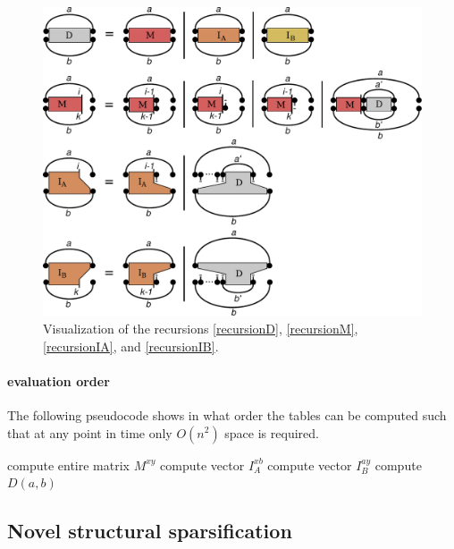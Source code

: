 \documentclass{article}
\newcommand{\DTmat}[2]{D(#1,#2)}
\begin{document}
\begin{figure}
  \centering
  \includegraphics[width=\linewidth]{Figs/recursion}
  \caption{Visualization of the recursions
    \ref{recursionD}, \ref{recursionM},
    \ref{recursionIA}, and \ref{recursionIB}.}
  \label{fig:recursion}
\end{figure}

\paragraph{evaluation order}
The following pseudocode shows in what order the tables can be
computed such that at any point in time only $O(n^2)$ space is
required.
\begin{algorithmic}
    \STATE compute entire matrix $M^{xy}$
      \STATE compute vector $I_A^{xb}$
    \ENDFOR
      \STATE compute vector $I_B^{ay}$
    \ENDFOR
      \STATE compute $\DTmat{a}{b}$
    \ENDFOR
  \ENDFOR
\ENDFOR
\end{algorithmic}

\subsection{Novel structural sparsification}
\end{document}
